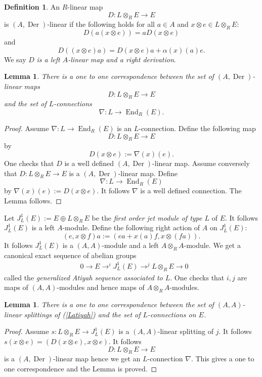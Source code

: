 \documentclass{amsart}
\theoremstyle{plain}
\newtheorem{lemma}[theorem]{Lemma}
\theoremstyle{definition}
\newtheorem{definition}[theorem]{Definition}
\theoremstyle{remark}
\numberwithin{equation}{theorem}
\begin{document}
\begin{definition} An ${R}$-linear map
\[ D:L\otimes_{R} E\rightarrow E\]
is $({A},{\operatorname{Der} })$-linear if the following holds for all $a\in {A}$ and $x\otimes e\in L\otimes_{R} E$:
\[ D(a(x\otimes e))=aD(x\otimes e)\]
and
\[D((x\otimes e)a)=D(x\otimes e)a+\alpha(x)(a)e.\]
We say $D$ \emph{is a left ${A}$-linear map and a right derivation}.
\end{definition}

\begin{lemma}\label{onetoone} There is a one to one correspondence between the set of $({A},{\operatorname{Der} })$-linear maps
\[ D:L\otimes_{R} E\rightarrow E\]
and the set of $L$-connections
\[ \nabla:L\rightarrow {\operatorname{End} }_{R}(E).\]
\end{lemma}
\begin{proof} Assume $\nabla:L\rightarrow {\operatorname{End} }_{R}(E)$ is an $L$-connection.
Define the following map
\[ D:L\otimes_{R} E \rightarrow E\]
by
\[ D(x\otimes e):=\nabla(x)(e).\] One checks that $D$ is a well defined $({A},{\operatorname{Der} })$-linear map.
Assume conversely that $D:L\otimes_{R} E\rightarrow E$ is a $({A},{\operatorname{Der} })$-linear map.
Define
\[\nabla:L\rightarrow {\operatorname{End} }_{R}(E) \]
by $\nabla(x)(e):=D(x\otimes e)$. It follows $\nabla$ is a well defined connection. The Lemma follows.
\end{proof}

Let $J^1_L(E):=E\oplus L\otimes_{R} E$ be the \emph{first order jet module of type $L$} of $E$. It follows
$J^1_L(E)$  is a left ${A}$-module. Define the following right action of ${A}$ on $J^1_L(E)$:
\[ (e,x\otimes f)a:=(ea+x(a)f, x\otimes (fa)).\]
It follows $J^1_L(E)$ is a $({A},{A})$-module and  a left ${A}\otimes_{R} {A}$-module.
We get a canonical exact sequence of abelian groups
\begin{align}
&\label{Latiyah} 0\rightarrow E \rightarrow^i J^1_L(E) \rightarrow^j L\otimes_{R} E\rightarrow 0
\end{align}
called the \emph{generalized Atiyah sequence associated to $L$}.
One checks that $i,j$ are maps of $({A},{A})$-modules and hence maps of ${A}\otimes_{R} {A}$-modules.

\begin{lemma} \label{LATsequence}
There is a one to one correspondence between the set of $({A},{A})$-linear splittings of (\ref{Latiyah})
and the set of $L$-connections on $E$.
\end{lemma}
\begin{proof} Assume $s:L\otimes_{R} E\rightarrow J^1_L(E)$ is a $({A},{A})$-linear splitting of $j$.
It follows $s(x\otimes e)=(D(x\otimes e),x\otimes e)$. It follows
\[ D:L\otimes_{R} E\rightarrow E\]
is a $({A},{\operatorname{Der} })$-linear map hence we get an $L$-connection $\nabla$. This gives a one to one correspondence
and the Lemma is proved.
\end{proof}
\end{document}
